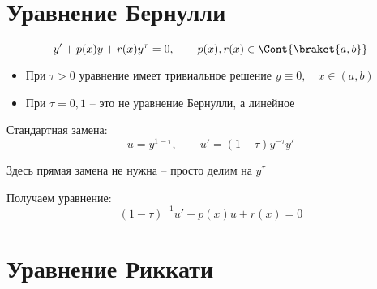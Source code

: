\section{Уравнение Бернулли}

$$ y' + p(x)y + r(x)y^\tau = 0, \qquad p(x), r(x) \in \Cont{\braket{a, b}} $$
\begin{remark}
    \hfill
    \begin{itemize}
        \item При $ \tau > 0 $ уравнение имеет тривиальное решение $ y \equiv 0, \quad x \in (a, b) $
        \item При $ \tau = 0, 1 $ -- это не уравнение Бернулли, а линейное
    \end{itemize}
\end{remark}
Стандартная замена:
$$ u = y^{1 - \tau}, \qquad u' = (1 - \tau)y^{-\tau}y' $$
\begin{remark}
    Здесь прямая замена не нужна -- просто делим на $ y^\tau $
\end{remark}
Получаем уравнение:
$$ (1 - \tau)^{-1}u' + p(x)u + r(x) = 0 $$

\section{Уравнение Риккати}

